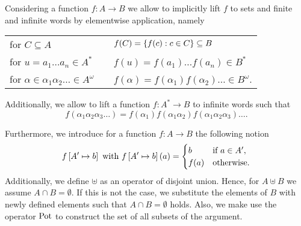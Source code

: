Considering a function $f:A\rightarrow B$ we allow to implicitly lift $f$ to
sets and finite and infinite words by elementwise application, namely
\begin{center}
  \begin{tabular}{lp{0.5cm}l}
    for $C\subseteq A$ & & $f(C) = \left\{f(c) : c\in C\right\}\subseteq B$ \\
    for $u = a_{1}\dots a_{n}\in A^{*}$ & & $f(u) = f(a_{1})
    \dots f(a_{n}) \in B^{*}$ \\
  for $\alpha\in\alpha_{1}\alpha_{2}\dots\in A^{\omega}$
    & & $f(\alpha) = f(\alpha_{1})f(\alpha_{2})\dots\in B^{\omega}$.\\
  \end{tabular}
\end{center}
Additionally, we allow to lift a function $f:A^{*}\rightarrow B$ to infinite
words such that
\begin{equation*}
  f(\alpha_{1}\alpha_{2}\alpha_{3}\dots) = f(\alpha_{1})f(
    \alpha_{1}\alpha_{2})f(\alpha_{1}\alpha_{2}\alpha_{3})\dots.
\end{equation*}

Furthermore, we introduce for a function $f:A\rightarrow B$ the following
notion
\begin{equation*}
  f\left[A'\mapsto b\right]\text{ with }f\left[A'\mapsto b\right](a) = 
  \begin{cases}
    b&\text{if }a\in A',\\
    f(a)&\text{otherwise}.
  \end{cases}
\end{equation*}
Additionally, we define $\uplus$ as an operator of disjoint union. Hence, for
$A\uplus B$ we assume $A\cap B = \emptyset$. If this is not the case, we
substitute the elements of $B$ with newly defined elements such that
$A\cap B = \emptyset$ holds. Also, we make use the operator $\operatorname{Pot}$ to construct
the set of all subsets of the argument.
